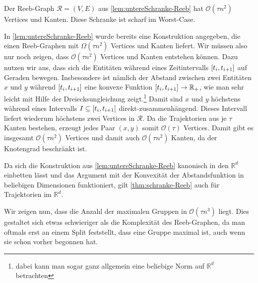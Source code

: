 \begin{satz}[name={\cite[Thm.~2]{buchin2015}},label=thm:schranke-Reeb]
	Der Reeb-Graph $\mathcal{R}=(V,E)$ aus \cref{lem:untereSchranke-Reeb} hat $\mathcal{O}(\tau n^2)$ Vertices und Kanten.
	Diese Schranke ist scharf im Worst-Case.
\end{satz}
\begin{beweis}
	In \cref{lem:untereSchranke-Reeb} wurde bereits eine Konstruktion angegeben, die einen Reeb-Graphen mit $\Omega(\tau n^2)$ Vertices und Kanten liefert.
	Wir müssen also nur noch zeigen, dass $\mathcal{O}(\tau n^2)$ Vertices und Kanten entstehen können.
	Dazu nutzen wir aus, dass sich die Entitäten während eines Zeitintervalls $\benbrace*{t_i,t_{i+1}}$ auf Geraden bewegen.
	Insbesondere ist nämlich der Abstand zwischen zwei Entitäten $x$ und $y$ während $\benbrace*{t_i,t_{i+1}}$ eine konvexe Funktion $\benbrace*{t_i,t_{i+1}} \to \mathbb{R}_+$, wie man sehr leicht mit Hilfe der Dreiecksungleichung zeigt.\footnote{dabei kann man sogar ganz allgemein eine beliebige Norm auf $\mathbb{R}^d$ betrachten}
	Damit sind $x$ und $y$ höchstens während eines Intervalls $I \subseteq \benbrace*{t_i,t_{i+1}}$ direkt-zusammenhängend.
	Dieses Intervall liefert wiederum höchstens zwei Vertices in $\mathcal{R}$.
	Da die Trajektorien aus je $\tau$ Kanten bestehen, erzeugt jedes Paar $(x,y)$ somit $\mathcal{O}(\tau)$ Vertices.
	Damit gibt es insgesamt $\mathcal{O}(\tau n^2)$ Vertices und damit auch $\mathcal{O}(\tau n^2)$ Kanten, da der Knotengrad beschränkt ist.
\end{beweis}

Da sich die Konstruktion aus \cref{lem:untereSchranke-Reeb} kanonisch in den $\mathbb{R}^d$ einbetten lässt und das Argument mit der Konvexität der Abstandsfunktion in beliebigen Dimensionen funktioniert, gilt \cref{thm:schranke-Reeb} auch für Trajektorien im $\mathbb{R}^d$.

Wir zeigen nun, dass die Anzahl der maximalen Gruppen in $\mathcal{O}(\tau n^3)$ liegt.
Dies gestaltet sich etwas schwieriger als die Komplexität des Reeb-Graphen, da man oftmals erst an einem Split feststellt, dass eine Gruppe maximal ist, auch wenn sie schon vorher begonnen hat.

